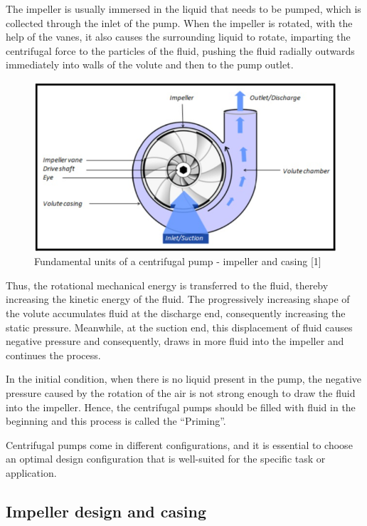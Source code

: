 \documentclass[11pt,a4paper]{scrartcl}
\begin{document}
The impeller is usually immersed in the liquid that needs to be pumped, which is collected through the inlet of the pump. When the impeller is rotated, with the help of the vanes, it also causes the surrounding liquid to rotate, imparting the centrifugal force to the particles of the fluid, pushing the fluid radially outwards immediately into walls of the volute and then to the pump outlet. 

\begin{figure}[h]
    \centering
    \includegraphics[scale=0.8]{image1.png}
    \caption{ Fundamental units of a centrifugal pump - impeller and casing [1]}
    \label{fig:image1}
\end{figure}
Thus, the rotational mechanical energy is transferred to the fluid, thereby increasing the kinetic energy of the fluid. The progressively increasing shape of the volute accumulates fluid at the discharge end, consequently increasing the static pressure. Meanwhile, at the suction end, this displacement of fluid causes negative pressure and consequently, draws in more fluid into the impeller and continues the process. \par

In the initial condition, when there is no liquid present in the pump, the negative pressure caused by the rotation of the air is not strong enough to draw the fluid into the impeller. Hence, the centrifugal pumps should be filled with fluid in the beginning and this process is called the “Priming”.\par 

Centrifugal pumps come in different configurations, and it is essential to choose an optimal design configuration that is well-suited for the specific task or application.

\subsection{Impeller design and casing}
\end{document}
